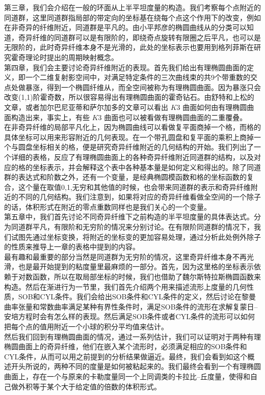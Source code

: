 第三章，我们会介绍在一般的环面从上半平坦度量的构造。我们考察每个点附近的同道群，这里同道群指局部的带定向的坐标基在绕每个点这个作用下的改变，例如在非奇异的纤维附近，同道群是平凡的。由小平邦彦的椭圆曲线从的分类可以知道，奇异纤维的同道群可以是有限阶的，即绕奇点旋转有限圈之后平凡，也可以是无限阶的，此时奇异纤维本身不是光滑的，此处的坐标表示也要用到格列菲斯在研究霍奇理论时提出的周期映射概念。\\ \indent
第四章，我们会主要讨论奇异纤维附近的表现。首先我们给出有理椭圆曲面的定义，即一个二维复射影空间中，对满足特定条件的三次曲线束的共9个带重数的交点处做暴涨，得到一个椭圆纤维从，而全空间被称为有理椭圆曲面。因为暴涨只会改变(1,1)阶霍奇数，所以很容易得出有理椭圆曲面的霍奇钻石。由舒特和上松的文章，或者加尔巴尼亚蒂和萨尔加多的文章可以看出 $K3$ 曲面如何由有理椭圆曲面构造出来，事实上，有些 $K3$ 曲面也可以被看做有理椭圆曲面的二重覆叠。\\ \indent
在非奇异纤维的局部平凡化上，因为椭圆曲线可以看做复平面商掉一个格，而格的具体坐标可以用来形容附近的几何表现。在一个带孔圆盘和复平面的乘积上商掉一个与圆盘坐标相关的格，便是研究奇异纤维附近的几何结构的开始。我们列出了一个详细的表格，反应了有理椭圆曲面上的各种奇异纤维附近同道群的结构，以及对应的格的坐标表示，并会解释这个表中各种基本量是如何定义和得出的。除了同道群的表达式和阶数之外，还有一个变量，是经典椭圆模函数和格的坐标函数的复合，这个量在取值0,1,无穷和其他值的时候，也会带来同道群的表示和奇异纤维附近的不同的几何结构。我们注意到，如果将对应的奇异纤维看做全空间的一个除子的话，体积形式在附近的零点重数同样也是我们关心的一个变量。\\ \indent
第五章中，我们首先讨论不同奇异纤维下之前构造的半平坦度量的具体表达式。分为同道群平凡，有限阶和无穷阶的情况来分别讨论。在有限阶同道群的情况下，我们试图先通过坐标变换，将附近的坐标变的更加容易处理，通过分析此处例外除子的性质来推导上一章的表格中提到的内容。\\ \indent
最有趣和最重要的部分当然是同道群为无穷阶的情况，这里奇异纤维本身不再光滑，也是最开始提到的粘度量里最麻烦的一部分。首先，因为这里格的坐标表示依赖于对数函数，所以在取局部坐标的时候，我们也借助了魏尔斯特拉斯椭圆函数来构造。然后在渐进行为一节里，我们首先介绍两个用来描述流形上度量的几何性质，SOB和CYL条件。我们会给出SOB条件和CYL条件的定义，然后讨论在黎曼曲率张量和常数曲率满足某种有界性条件时，满足SOB条件的流形在求解复蒙日--安培方程时会有怎么样的表现。然后满足SOB条件或者CYL条件的流形可以如何把每个点的值用附近一个小球的积分平均值来估计。\\ \indent
然后我们回到有理椭圆曲面的情况，通过一系列估计，我们可以证明对于两种有理椭圆曲面上的奇异纤维，他们在嵌入某个流形时，必须满足相应的SOB条件和CYL条件，从而可以用之前提到的分析结果做逼近。最终，我们会看到如这个概述开头所说的，两种不同的度量是如何被粘起来的。我们最终会看到一个有理椭圆曲面上，存在一个与原来的卡勒度量同一个上同调类的卡拉比--丘度量，使得和自己做外积等于某个大于给定值的倍数的体积形式。\\ \indent
